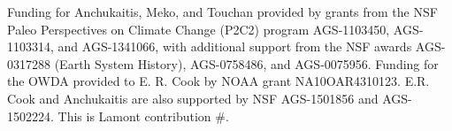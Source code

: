 \documentclass[draft,jgr]{AGUTeX}
\begin{document}
\begin{article}

\begin{acknowledgments}
Funding for Anchukaitis, Meko, and Touchan provided by grants from the NSF Paleo Perspectives on Climate Change (P2C2) program AGS-1103450, AGS-1103314, and AGS-1341066, with additional support from the NSF awards AGS-0317288 (Earth System History), AGS-0758486, and AGS-0075956. Funding for the OWDA provided to E. R. Cook by NOAA grant NA10OAR4310123.  E.R. Cook and Anchukaitis are also supported by NSF AGS-1501856 and AGS-1502224. This is Lamont contribution \#.
\end{acknowledgments}


















\end{article}
\end{document}
